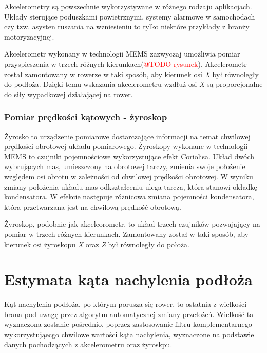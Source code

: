 Akcelerometry są powszechnie wykorzystywane w różnego rodzaju aplikacjach. Układy sterujące poduszkami powietrznymi, systemy alarmowe w samochodach czy tzw. asysten ruszania na wzniesieniu to tylko niektóre przykłady z branży motoryzacyjnej.

Akcelerometr wykonany w technologii MEMS zazwyczaj umożliwia pomiar przyspieszenia w trzech różnych kierunkach(\textcolor{red}{@TODO rysunek}). Akcelerometr został zamontowany w rowerze w taki sposób, aby kierunek osi \textit{X} był równoległy do podłoża. Dzięki temu wskazania akcelerometru wzdłuż osi \textit{X} są proporcjonalne do siły wypadkowej działającej na rower.
\subsubsection{Pomiar prędkości kątowych - żyroskop}
Żyrosko to urządzenie pomiarowe dostarczające informacji na temat chwilowej prędkości obrotowej układu pomiarowego. Żyroskopy wykonane w technologii MEMS to czujniki pojemnościowe wykorzystujące efekt Coriolisa. Układ dwóch wybrujących mas, umieszczony na obrotowej tarczy, zmienia swoje położenie względem osi obrotu w zależności od chwilowej prędkości obrotowej. W wyniku zmiany położenia układu mas odkształceniu ulega tarcza, która stanowi okładkę kondensatora. W efekcie następuje różnicowa zmiana pojemności kondensatora, która przetwarzana jest na chwilową prędkość obrotową.

Żyroskop, podobnie jak akceleorometr, to układ trzech czujników pozwajający na pomiar w trzech różnych kierunkach. Zamontowany został w taki sposób, aby kierunek osi żyroskopu \textit{X} oraz \textit{Z}  był równoległy do położa.

\section{Estymata kąta nachylenia podłoża}
Kąt nachylenia podłoża, po którym porusza się rower, to ostatnia z wielkości  brana pod uwagę przez algorytm automatycznej zmiany przełożeń. Wielkość ta wyznaczona zostanie pośrednio, poprzez zastosowanie filtru komplementarnego wykorzystująecgo chwilowe wartości kąta nachylenia, wyznaczone na podstawie danych pochodzących z akcelerometru oraz żyroskpu.

